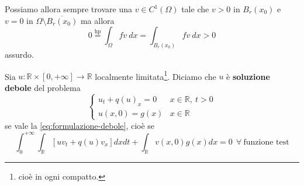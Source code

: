 \documentclass[10pt,a4paper,twoside,openright]{book}
\begin{document}
\begin{dimostrazione}
\begin{figure}[H]
\end{figure}
\FloatBarrier

Possiamo allora sempre trovare una $v\in C^{1}( \Omega )$ tale che $v >0$ in $B_{r}( x_{0})$ e $v=0$ in $\Omega \setminus \overline{B_{r}( x_{0})}$ ma allora
\begin{equation*}
	0 \overset{\text{hp}}{=} \int _{\Omega } fv\ dx=\int _{B_{r}( x_{0})} fv\ dx >0
\end{equation*}
assurdo.
\end{dimostrazione}
\begin{definition}
	 Sia $u:\mathbb{R} \times [ 0,+\infty ]\rightarrow \mathbb{R}$ localmente limitata\footnote{cioè in ogni compatto.}. Diciamo che $u$ è \textbf{soluzione debole} del problema
	\begin{equation*}
		\begin{cases}
			u_{t} +q( u)_{x} =0 & x\in \mathbb{R} ,\ t >0 \\
			u( x,0) =g( x)      & x\in \mathbb{R}         
		\end{cases}
	\end{equation*}
	se vale la \eqref{eq:formulazione-debole}, cioè se
	\begin{equation*}
		\int ^{+\infty }_{0}\int _{\mathbb{R}}[ uv_{t} +q( u) v_{x}] dxdt+\int _{\mathbb{R}} v( x,0) g( x) dx=0\ \ \forall \ \text{funzione test}
	\end{equation*}
\end{definition}
\end{document}
